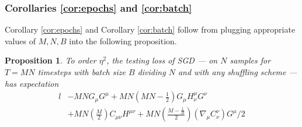 \documentclass[anon,12pt]{colt2021} %
\newtheorem{prop}{Proposition}
\newcommand{\wrap}[1]{\left(#1\right)}
\begin{document}
        \subsubsection{Corollaries \ref{cor:epochs} and \ref{cor:batch}}

            Corollary \ref{cor:epochs} and Corollary \ref{cor:batch} follow
            from plugging appropriate values of $M, N, B$ into the following
            proposition.

            \begin{prop}\label{prop:ordtwo}
                To order $\eta^2$, the testing loss of SGD --- on $N$ samples
                for $T=MN$ timesteps with batch size $B$ dividing $N$ and with
                any shuffling scheme --- has expectation
                {\small
                \begin{align*}
                                                            l              
                    &- MN                                   G_\mu G^\mu       
                     + MN\wrap{MN - \frac{1}{2}}            G_\mu H^{\mu}_{\nu} G^\nu \\
                    &+ MN\wrap{\frac{M}{2}}                 C_{\mu \nu} H^{\mu \nu}
                     + MN\wrap{\frac{M-\frac{1}{B}}{2}}     \wrap{\nabla_\mu C^{\nu}_{\nu}} G^\mu / 2
                \end{align*}
                }
            \end{prop}
\end{document}

